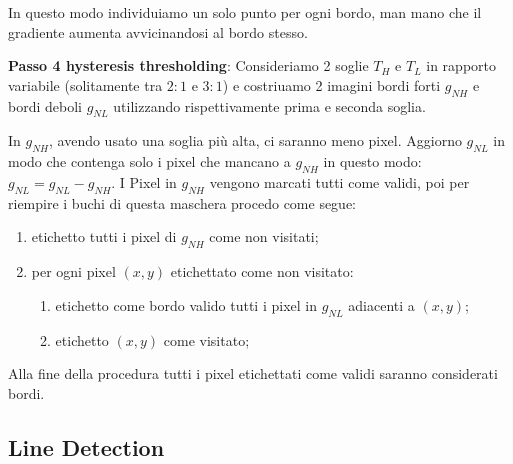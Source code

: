 In questo modo individuiamo un solo punto per ogni bordo, man mano che il gradiente aumenta avvicinandosi al bordo stesso.

\textbf{Passo 4 hysteresis thresholding}: Consideriamo 2 soglie $T_H$ e $T_L$ in rapporto variabile (solitamente tra $2:1$ e  $3:1$) e costriuamo 2 imagini bordi forti $g_{NH}$ e  bordi deboli $g_{NL}$ utilizzando rispettivamente prima e seconda soglia.

In $g_{NH}$, avendo usato una soglia più alta, ci saranno meno pixel. Aggiorno $g_{NL}$ in modo che contenga solo i pixel che mancano a $g_{NH}$ in questo modo: $g_{NL}=g_{NL}-g_{NH}$. I Pixel in $g_{NH}$ vengono marcati tutti come validi, poi per riempire i buchi di questa maschera procedo come segue: 
\begin{enumerate}
	\item etichetto tutti i pixel di $g_{NH}$ come non visitati;
	\item per ogni pixel $(x,y)$ etichettato come non visitato:
	\begin{enumerate}
		\item etichetto come bordo valido tutti i pixel in $g_{NL}$ adiacenti a $(x,y)$;
		\item etichetto $(x,y)$ come visitato;
	\end{enumerate}
\end{enumerate}
Alla fine della procedura tutti i pixel etichettati come validi saranno considerati bordi.

\subsection{Line Detection}
